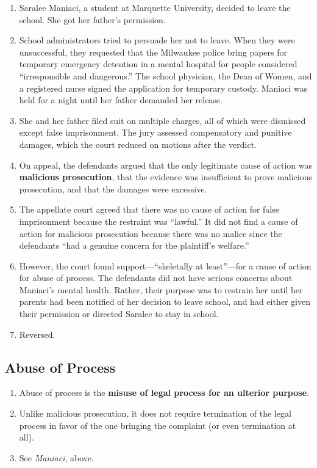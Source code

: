\begin{enumerate}
    \item Saralee Maniaci, a student at Marquette University, decided to leave 
    the school. She got her father's permission.
    \item School administrators tried to persuade her not to leave. When they 
    were unsuccessful, they requested that the Milwaukee police bring papers 
    for temporary emergency detention in a mental hospital for people 
    considered ``irresponsible and dangerous.'' The school physician, the Dean 
    of Women, and a registered nurse signed the application for temporary 
    custody. Maniaci was held for a night until her father demanded her 
    release.
    \item She and her father filed suit on multiple charges, all of which were 
    dismissed except false imprisonment. The jury assessed compensatory and 
    punitive damages, which the court reduced on motions after the verdict.
    \item On appeal, the defendants argued that the only legitimate cause of 
    action was \textbf{malicious prosecution}, that the evidence was 
    insufficient to prove malicious prosecution, and that the damages were 
    excessive.
    \item The appellate court agreed that there was no cause of action for 
    false imprisonment because the restraint was ``lawful.'' It did not find a 
    cause of action for malicious prosecution because there was no malice 
    since the defendants ``had a genuine concern for the plaintiff's 
    welfare.'' \item However, the court found support---``skeletally at 
    least''---for a cause of action for abuse of process. The defendants did 
    not have serious concerns about Maniaci's mental health. Rather, their 
    purpose was to restrain her until her parents had been notified of her 
    decision to leave school, and had either given their permission or 
    directed Saralee to stay in school.
    \item Reversed.  \end{enumerate}

\subsection{Abuse of Process}

\begin{enumerate}
    \item Abuse of process is the \textbf{misuse of legal process for an 
    ulterior purpose}.
    \item Unlike malicious prosecution, it does not require termination of the 
    legal process in favor of the one bringing the complaint (or even 
    termination at all).
    \item See \emph{Maniaci}, above.
\end{enumerate}

